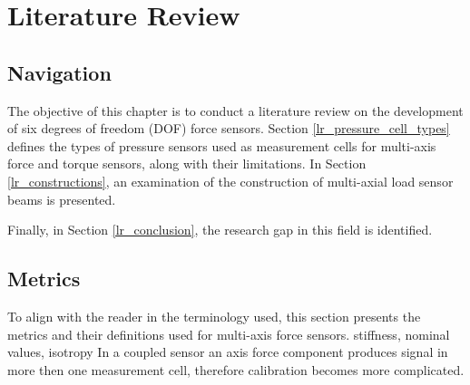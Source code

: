 \chapter{Literature Review}
\label{chapter:literature_review}

\section{Navigation}
\label{lr_navigation}




The objective of this chapter is to conduct a literature review on the development of six degrees of freedom (DOF) force sensors. 
Section \ref{lr_pressure_cell_types} defines the types of pressure sensors used as measurement cells for multi-axis force and torque sensors, 
along with their limitations. 
In Section \ref{lr_constructions}, an examination of the construction of multi-axial load sensor beams is presented. 


Finally, in Section \ref{lr_conclusion}, the research gap in this field is identified.

\section{Metrics}

To align with the reader in the terminology used, this section presents the metrics and their definitions used for multi-axis force sensors.
stiffness, nominal values, isotropy
In a coupled sensor an axis force component produces signal in more then one measurement cell, therefore calibration becomes more complicated.
